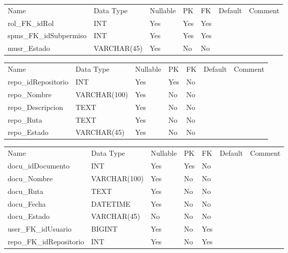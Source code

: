 			\begin{center}
				\begin{tabular}{ |l|l|l|l|l|l|l| }
					\hline
					Name & Data Type & Nullable & PK & FK & Default & Comment \\
					rol_FK_idRol & INT & Yes & Yes & Yes &  & \\ \hline 
spms_FK_idSubpermiso & INT & Yes & Yes & Yes &  & \\ \hline 
musr_Estado & VARCHAR(45) & Yes & No & No &  & \\ \hline 

				\end{tabular}
			\end{center}
		

			\begin{center}
				\begin{tabular}{ |l|l|l|l|l|l|l| }
					\hline
					Name & Data Type & Nullable & PK & FK & Default & Comment \\
					repo_idRepositorio & INT & Yes & Yes & No &  & \\ \hline 
repo_Nombre & VARCHAR(100) & Yes & No & No &  & \\ \hline 
repo_Descripcion & TEXT & Yes & No & No &  & \\ \hline 
repo_Ruta & TEXT & Yes & No & No &  & \\ \hline 
repo_Estado & VARCHAR(45) & Yes & No & No &  & \\ \hline 

				\end{tabular}
			\end{center}
		

			\begin{center}
				\begin{tabular}{ |l|l|l|l|l|l|l| }
					\hline
					Name & Data Type & Nullable & PK & FK & Default & Comment \\
					docu_idDocumento & INT & Yes & Yes & No &  & \\ \hline 
docu_Nombre & VARCHAR(100) & Yes & No & No &  & \\ \hline 
docu_Ruta & TEXT & Yes & No & No &  & \\ \hline 
docu_Fecha & DATETIME & Yes & No & No &  & \\ \hline 
docu_Estado & VARCHAR(45) & No & No & No &  & \\ \hline 
user_FK_idUsuario & BIGINT & Yes & No & Yes &  & \\ \hline 
repo_FK_idRepositorio & INT & Yes & No & Yes &  & \\ \hline 

				\end{tabular}
			\end{center}
		

